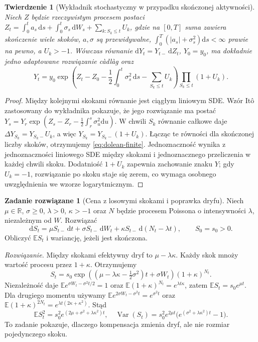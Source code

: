\documentclass[11pt,a4paper,oneside]{report}
\numberwithin{equation}{chapter}
\theoremstyle{plain}
\newtheorem{twierdzenie}{Twierdzenie}[chapter]
\theoremstyle{definition}
\newtheorem{zadanie}{Zadanie rozwiązane}[chapter]
\theoremstyle{remark}
\newcommand{\R}{\mathbb{R}}
\newcommand{\E}{\mathbb{E}}
\newcommand{\Var}{\operatorname{Var}}
\newcommand{\dd}{\mathrm{d}}
\begin{document}
\begin{twierdzenie}[Wykładnik stochastyczny w przypadku skończonej aktywności]\label{thm:volIII:12:03}
\label{th:dolean-finite}
Niech $Z$ będzie rzeczywistym procesem postaci
$Z_t=\int_0^t a_s\,\dd s+\int_0^t\sigma_s\,\dd W_s
+\sum_{k:S_k\le t}U_k$, gdzie na $[0,T]$ suma zawiera
skończenie wiele skoków, $a,\sigma$ są przewidywalne,
$\int_0^T(|a_s|+\sigma_s^2)\dd s<\infty$ prawie na pewno, a
$U_k>-1$. Wówczas równanie
$\dd Y_t=Y_{t-}\,\dd Z_t$, $Y_0=y_0$, ma dokładnie jedno
adaptowane rozwiązanie càdlàg oraz
\[
Y_t=y_0\exp\left(Z_t-Z_0-\frac12\int_0^t\sigma_s^2\,\dd s
-\sum_{S_k\le t}U_k\right)
\prod_{S_k\le t}(1+U_k).
\tag{12.5}\label{eq:dolean-finite}
\]
\end{twierdzenie}
\begin{proof}
Między kolejnymi skokami równanie jest ciągłym liniowym
SDE. Wzór Itô zastosowany do wykładnika pokazuje,
że jego rozwiązanie ma postać
$Y_s=Y_r\exp(Z_s-Z_r-\frac12\int_r^s\sigma_u^2\dd u)$.
W chwili $S_k$ równanie całkowe daje
$\Delta Y_{S_k}=Y_{S_k-}U_k$, a więc
$Y_{S_k}=Y_{S_k-}(1+U_k)$.
Łącząc te równości dla skończonej liczby skoków,
otrzymujemy \eqref{eq:dolean-finite}. Jednoznaczność
wynika z jednoznaczności liniowego SDE między skokami
i jednoznacznego przeliczenia w każdej chwili skoku.
Dodatniość $1+U_k$ zapewnia zachowanie znaku $Y$;
gdy $U_k=-1$, rozwiązanie po skoku staje się zerem,
co wymaga osobnego uwzględnienia we wzorze logarytmicznym.
\end{proof}

\begin{zadanie}[Cena z losowymi skokami i poprawka dryfu]
Niech $\mu\in\R$, $\sigma\ge0$, $\lambda>0$, $\kappa>-1$
oraz $N$ będzie procesem Poissona o intensywności $\lambda$,
niezależnym od $W$. Rozwiązać
\[
\dd S_t=\mu S_{t-}\,\dd t+\sigma S_{t-}\,\dd W_t
+\kappa S_{t-}\,\dd(N_t-\lambda t),\qquad S_0=s_0>0.
\]
Obliczyć $\E S_t$ i wariancję, jeżeli jest skończona.

\emph{Rozwiązanie.} Między skokami efektywny dryf to
$\mu-\lambda\kappa$. Każdy skok mnoży wartość procesu
przez $1+\kappa$. Otrzymujemy
\[
S_t=s_0\exp\left((\mu-\lambda\kappa-\tfrac12\sigma^2)t
+\sigma W_t\right)(1+\kappa)^{N_t}.
\]
Niezależność daje
$\E e^{\sigma W_t-\sigma^2t/2}=1$ oraz
$\E(1+\kappa)^{N_t}=e^{\lambda t\kappa}$,
zatem $\E S_t=s_0e^{\mu t}$.
Dla drugiego momentu używamy
$\E e^{2\sigma W_t-\sigma^2t}=e^{\sigma^2t}$ oraz
$\E(1+\kappa)^{2N_t}=e^{\lambda t(2\kappa+\kappa^2)}$.
Stąd
\[
\E S_t^2=s_0^2e^{(2\mu+\sigma^2+\lambda\kappa^2)t},
\quad
\Var(S_t)=s_0^2e^{2\mu t}
\bigl(e^{(\sigma^2+\lambda\kappa^2)t}-1\bigr).
\]
To zadanie pokazuje, dlaczego kompensacja zmienia dryf,
ale nie rozmiar pojedynczego skoku.
\end{zadanie}
\end{document}
